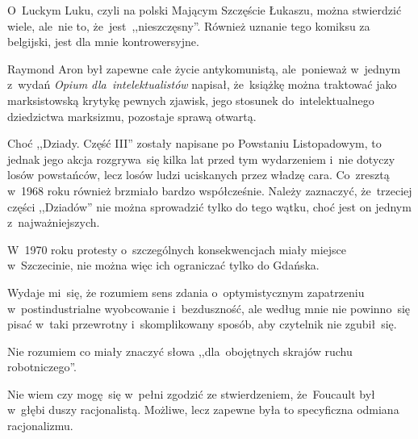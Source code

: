 \documentclass[a4paper,11pt]{article}
\begin{document}
\vspace{\spaceFour}


\start {} O~Luckym Luku, czyli na polski Mającym
Szczęście Łukaszu, można stwierdzić wiele, ale~nie to,
że~jest~,,nieszczęsny''. Również uznanie tego komiksu za belgijski,
jest dla mnie kontrowersyjne.

\vspace{\spaceFour}


\start {} Raymond Aron był zapewne całe życie antykomunistą,
ale~ponieważ w~jednym z~wydań \emph{Opium dla~intelektualistów}
napisał, że~książkę można traktować jako marksistowską krytykę pewnych
zjawisk, jego stosunek do~intelektualnego dziedzictwa marksizmu,
pozostaje sprawą otwartą.

\vspace{\spaceFour}


\start {} Choć ,,Dziady. Część III'' zostały napisane po
Powstaniu Listopadowym, to jednak jego akcja rozgrywa~się kilka lat
przed tym wydarzeniem i~nie dotyczy losów powstańców, lecz losów ludzi
uciskanych przez władzę cara. Co~zresztą w~1968 roku również brzmiało
bardzo współcześnie. Należy zaznaczyć, że~trzeciej części ,,Dziadów''
nie można sprowadzić tylko do tego wątku, choć jest on jednym
z~najważniejszych.

\vspace{\spaceFour}


\start {} W~1970 roku protesty o~szczególnych
konsekwencjach miały miejsce w~Szczecinie, nie można więc ich
ograniczać tylko do Gdańska.

\vspace{\spaceFour}


\start {} Wydaje mi~się, że rozumiem sens zdania
o~optymistycznym zapatrzeniu w~postindustrialne wyobcowanie
i~bezduszność, ale według mnie nie powinno~się pisać w~taki przewrotny
i~skomplikowany sposób, aby czytelnik nie zgubił~się.

\vspace{\spaceFour}


\start {} Nie rozumiem co miały znaczyć słowa
,,dla~obojętnych skrajów ruchu robotniczego''.

\vspace{\spaceFour}


\start {} Nie wiem czy mogę~się w~pełni zgodzić ze
stwierdzeniem, że~Foucault był w~głębi duszy racjonalistą. Możliwe,
lecz zapewne była to specyficzna odmiana racjonalizmu.
\end{document}
